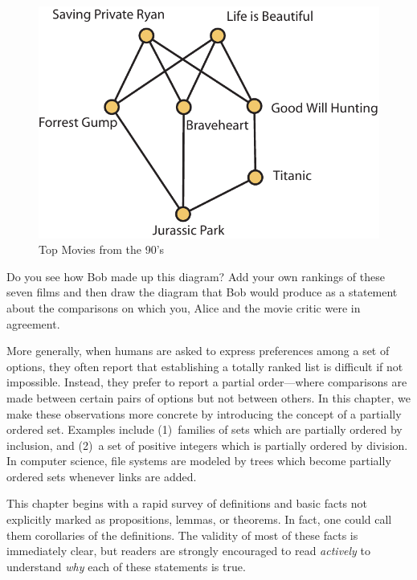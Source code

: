 \begin{figure}
\begin{center}
\includegraphics*[scale=.4]{posets-figs/newfig-1.pdf}
\caption{Top Movies from the 90's}
\label{fig:movies}
\end{center}
\end{figure}

Do you see how Bob made up this diagram?  Add your own rankings of these
seven films and then draw the diagram that Bob would produce as a statement
about the comparisons on which you, Alice and the movie critic were in agreement.

More generally, when humans are asked to express preferences among 
a set of options, they often report that establishing a totally ranked list 
is difficult if not impossible.  Instead, they prefer to report a partial 
order---where comparisons are made between certain pairs of options but not 
between others.  In this chapter, we
make these observations more concrete by introducing the concept of 
a partially ordered set.  Examples include (1)~families of sets which are
partially ordered by inclusion, and (2)~a set of positive integers which is
partially ordered by division.  In computer science, file systems are 
modeled by trees which become partially ordered sets whenever links are added.

This chapter begins with a rapid survey of definitions and basic facts
not explicitly marked as propositions, lemmas, or theorems. In fact,
one could call them corollaries of the definitions. The validity of
most of these facts is immediately clear, but readers are strongly
encouraged to read \emph{actively} to understand \emph{why} each of
these statements is true.

